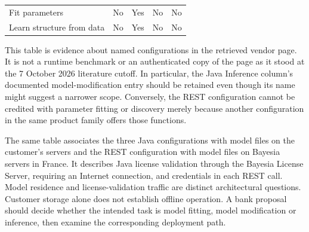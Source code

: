 \begin{longtable}[]{@{}lllll@{}}
\begin{minipage}[t]{0.17\columnwidth}\raggedright
Fit parameters\strut
\end{minipage} & \begin{minipage}[t]{0.17\columnwidth}\raggedright
No\strut
\end{minipage} & \begin{minipage}[t]{0.17\columnwidth}\raggedright
Yes\strut
\end{minipage} & \begin{minipage}[t]{0.17\columnwidth}\raggedright
No\strut
\end{minipage} & \begin{minipage}[t]{0.17\columnwidth}\raggedright
No\strut
\end{minipage}\tabularnewline
\begin{minipage}[t]{0.17\columnwidth}\raggedright
Learn structure from data\strut
\end{minipage} & \begin{minipage}[t]{0.17\columnwidth}\raggedright
No\strut
\end{minipage} & \begin{minipage}[t]{0.17\columnwidth}\raggedright
Yes\strut
\end{minipage} & \begin{minipage}[t]{0.17\columnwidth}\raggedright
No\strut
\end{minipage} & \begin{minipage}[t]{0.17\columnwidth}\raggedright
No\strut
\end{minipage}\tabularnewline
\bottomrule
\end{longtable}

This table is evidence about named configurations in the retrieved
vendor page. It is not a runtime benchmark or an authenticated copy of
the page as it stood at the 7 October 2026 literature cutoff. In
particular, the Java Inference column's documented model-modification
entry should be retained even though its name might suggest a narrower
scope. Conversely, the REST configuration cannot be credited with
parameter fitting or discovery merely because another configuration in
the same product family offers those functions.

The same table associates the three Java configurations with model files
on the customer's servers and the REST configuration with model files on
Bayesia servers in France. It describes Java license validation through
the Bayesia License Server, requiring an Internet connection, and
credentials in each REST call. Model residence and license-validation
traffic are distinct architectural questions. Customer storage alone
does not establish offline operation. A bank proposal should decide
whether the intended task is model fitting, model modification or
inference, then examine the corresponding deployment path.
\citep{exec13_bayesia_api}

